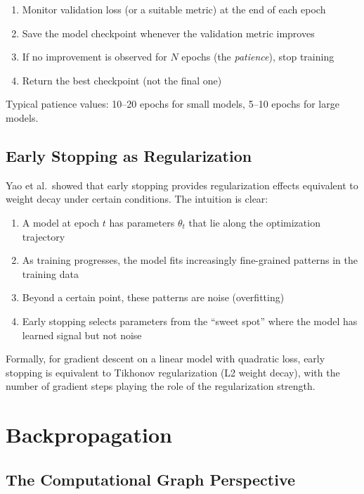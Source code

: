 \begin{enumerate}
    \item Monitor validation loss (or a suitable metric) at the end of each epoch
    \item Save the model checkpoint whenever the validation metric improves
    \item If no improvement is observed for $N$ epochs (the \emph{patience}), stop training
    \item Return the best checkpoint (not the final one)
\end{enumerate}

Typical patience values: 10--20 epochs for small models, 5--10 epochs for large models.

\subsection{Early Stopping as Regularization}

Yao et al.\ showed that early stopping provides regularization effects equivalent to weight decay under certain conditions. The intuition is clear:

\begin{enumerate}
    \item A model at epoch $t$ has parameters $\theta_t$ that lie along the optimization trajectory
    \item As training progresses, the model fits increasingly fine-grained patterns in the training data
    \item Beyond a certain point, these patterns are noise (overfitting)
    \item Early stopping selects parameters from the ``sweet spot'' where the model has learned signal but not noise
\end{enumerate}

Formally, for gradient descent on a linear model with quadratic loss, early stopping is equivalent to Tikhonov regularization (L2 weight decay), with the number of gradient steps playing the role of the regularization strength.

\section{Backpropagation}

\subsection{The Computational Graph Perspective}

